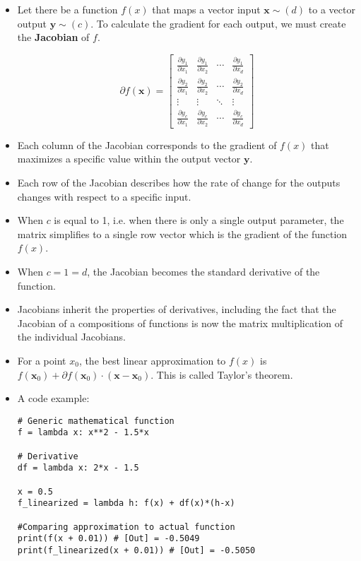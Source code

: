 \documentclass{article}
\newcommand{\mbf}[1]{\mathbf{#1}}
\begin{document}
\begin{itemize}
    \item Let there be a function $f(x)$ that maps a vector input $\mbf{x} \sim (d)$ to a vector output $\mbf{y} \sim (c)$. To calculate the gradient for each output, we must create the \textbf{Jacobian} of $f$.
        
        \[\partial f(\mathbf{x}) = 
        \begin{bmatrix}
        \frac{\partial y_1}{\partial x_1} & \frac{\partial y_1}{\partial x_2} & \cdots & \frac{\partial y_1}{\partial x_d} \\
        \frac{\partial y_2}{\partial x_1} & \frac{\partial y_2}{\partial x_2} & \cdots & \frac{\partial y_2}{\partial x_d} \\
        \vdots & \vdots & \ddots & \vdots \\
        \frac{\partial y_c}{\partial x_1} & \frac{\partial y_c}{\partial x_2} & \cdots & \frac{\partial y_c}{\partial x_d}
        \end{bmatrix}
        \]
    \item Each column of the Jacobian corresponds to the gradient of $f(x)$ that maximizes a specific value within the output vector $\mbf{y}$.
    \item Each row of the Jacobian describes how the rate of change for the outputs changes with respect to a specific input.
    \item When $c$ is equal to 1, i.e. when there is only a single output parameter, the matrix simplifies to a single row vector which is the gradient of the function $f(x)$.
    \item When $c = 1 = d$, the Jacobian becomes the standard derivative of the function. 
    \item Jacobians inherit the properties of derivatives, including the fact that the Jacobian of a compositions of functions is now the matrix multiplication of the individual Jacobians. 
    \item For a point $x_0$, the best linear approximation to $f(x)$ is $f(\mbf{x}_0) + \partial f(\mbf{x}_0) \cdot (\mbf{x} - \mbf{x}_0)$. This is called Taylor's theorem.
    \item A code example:
\begin{lstlisting}
# Generic mathematical function
f = lambda x: x**2 - 1.5*x

# Derivative 
df = lambda x: 2*x - 1.5

x = 0.5
f_linearized = lambda h: f(x) + df(x)*(h-x)

#Comparing approximation to actual function
print(f(x + 0.01)) # [Out] = -0.5049
print(f_linearized(x + 0.01)) # [Out] = -0.5050
\end{lstlisting}
\end{itemize}
\end{document}
